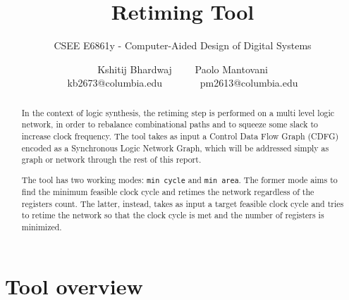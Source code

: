 \documentclass{acm_proc_article-sp}
\begin{document}
\title{Retiming Tool}
\subtitle{CSEE E6861y - Computer-Aided Design of Digital Systems}

\author{
\alignauthor
Kshitij Bhardwaj \ \ \ \ Paolo Mantovani\\
{\small kb2673@columbia.edu \ \ \ \ \ \ \ pm2613@columbia.edu}
}

\maketitle

\begin{abstract}
In the context of logic synthesis, the retiming step is performed on a multi
level logic network, in order to rebalance combinational paths and to squeeze
some slack to increase clock frequency.
The tool takes as input a Control Data Flow Graph (CDFG) encoded as a
Synchronous Logic Network Graph, which will be addressed simply as graph or
network through the rest of this report.

The tool has two working modes: \texttt{min cycle} and \texttt{min area}.
The former mode aims to find the minimum feasible clock cycle and retimes
the network regardless of the registers count. The latter, instead, takes
as input a target feasible clock cycle and tries to retime the network so
that the clock cycle is met and the number of registers is minimized.
\end{abstract}


\section{Tool overview}
\end{document}
